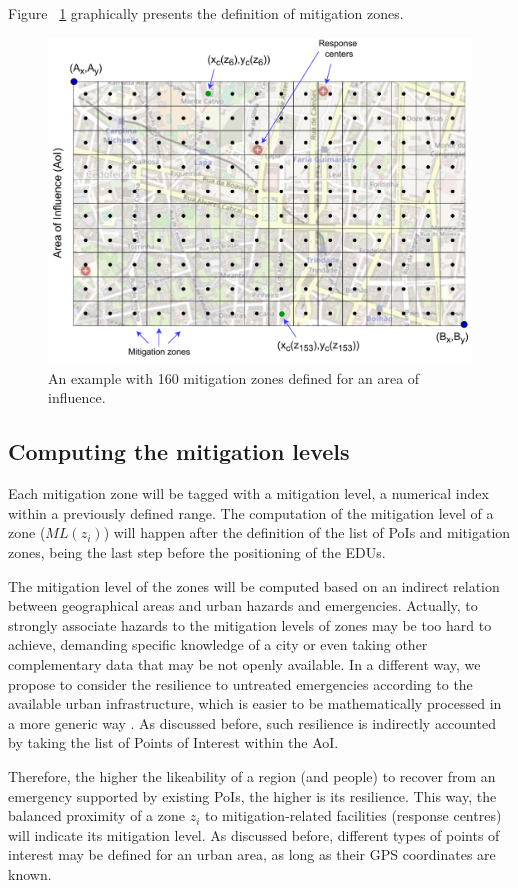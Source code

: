 \begin{refsection}
Figure ~\ref{Fig:figGrid} graphically presents the definition of mitigation zones.

\begin{figure}[htb!]
  \centering
  \includegraphics[width=0.77\linewidth]{Chapters/2-EDUs/images/MitigationZones.pdf}
  \caption{An example with 160 mitigation zones defined for an area of influence.}\label{Fig:figGrid}
\end{figure}

%
\subsection{Computing the mitigation levels}

Each mitigation zone will be tagged with a mitigation level, a numerical index within a previously defined range. The computation of the mitigation level of a zone ($ML(z_i)$) will happen after the definition of the list of PoIs and mitigation zones, being the last step before the positioning of the EDUs. 

The mitigation level of the zones will be computed based on an indirect relation between geographical areas and urban hazards and emergencies. Actually, to strongly associate hazards to the mitigation levels of zones may be too hard to achieve, demanding specific knowledge of a city or even taking other complementary data that may be not openly available. In a different way, we propose to consider the resilience to untreated emergencies according to the available urban infrastructure, which is easier to be mathematically processed in a more generic way \cite{emergencies1}. As discussed before, such resilience is indirectly accounted by taking the list of Points of Interest within the AoI.

Therefore, the higher the likeability of a region (and people) to recover from an emergency supported by existing PoIs, the higher is its resilience. This way, the balanced proximity of a zone $z_i$ to mitigation-related facilities (response centres) will indicate its mitigation level. As discussed before, different types of points of interest may be defined for an urban area, as long as their GPS coordinates are known.


\end{refsection}
